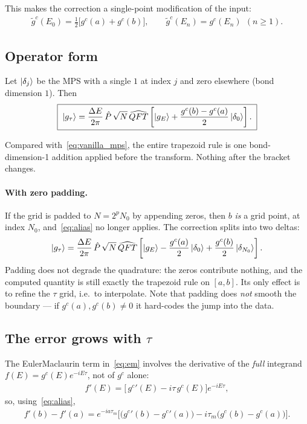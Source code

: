 \documentclass{article}
\begin{document}
	This makes the correction a single-point modification of the input:
	\begin{align}
		\boxed{\;\tilde{g}^c(E_0) = \tfrac12\big[g^c(a) + g^c(b)\big],
			\qquad \tilde{g}^c(E_n) = g^c(E_n)\ \ (n \ge 1).\;}
		\label{eq:trapez_merged}
	\end{align}
	
	\subsection{Operator form}
	
	Let $\ket{\delta_j}$ be the MPS with a single $1$ at index $j$ and zero
	elsewhere (bond dimension $1$). Then
	\begin{align}
		\boxed{\;\ket{g_\tau} = \frac{\Delta E}{2\pi}\,\hat{P}\,\sqrt{N}\,\widehat{QFT}
			\left[\ket{g_E} + \frac{g^c(b) - g^c(a)}{2}\ket{\delta_0}\right].\;}
		\label{eq:trapez_mps}
	\end{align}
	
	Compared with~\eqref{eq:vanilla_mps}, the entire trapezoid rule is one
	bond-dimension-1 addition applied before the transform. Nothing after the
	bracket changes.
	
	\paragraph{With zero padding.} If the grid is padded to $N = 2^p N_0$ by
	appending zeros, then $b$ \emph{is} a grid point, at index $N_0$, and~\eqref{eq:alias} no longer applies. The correction splits into two deltas:
	\begin{align}
		\ket{g_\tau} = \frac{\Delta E}{2\pi}\,\hat{P}\,\sqrt{N}\,\widehat{QFT}
		\left[\ket{g_E} - \frac{g^c(a)}{2}\ket{\delta_0}
		+ \frac{g^c(b)}{2}\ket{\delta_{N_0}}\right].
	\end{align}
	Padding does not degrade the quadrature: the zeros contribute nothing, and the
	computed quantity is still exactly the trapezoid rule on $[a,b]$. Its only
	effect is to refine the $\tau$ grid, i.e.\ to interpolate. Note that padding
	does \emph{not} smooth the boundary --- if $g^c(a),g^c(b) \neq 0$ it hard-codes
	the jump into the data.
	
	\subsection{The error grows with $\tau$}\label{sec:tau}
	
	The Euler\textendash{}Maclaurin term in~\eqref{eq:em} involves the derivative of the
	\emph{full} integrand $f(E) = g^c(E)e^{-iE\tau}$, not of $g^c$ alone:
	\begin{align}
		f'(E) = \big[\,{g^c}'(E) - i\tau\, g^c(E)\big]e^{-iE\tau},
	\end{align}
	so, using~\eqref{eq:alias},
	\begin{align}
		f'(b) - f'(a) = e^{-ia\tau_m}\Big[
		\big({g^c}'(b) - {g^c}'(a)\big)
		- i\tau_m\big(g^c(b) - g^c(a)\big)\Big].
	\end{align}
	
\end{document}
